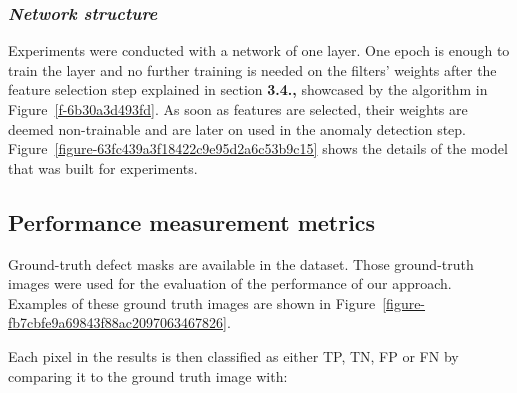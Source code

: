 \documentclass[3p,,preprint,review,12pt]{elsarticle}
\makeatletter
\def\fixFloatSize#1{}%
\makeatother
\begin{document}
\subsubsection{\textit{Network structure}}Experiments were conducted with a network of one layer. One epoch is enough to train the layer and no further training is needed on the filters' weights after the feature selection step explained in section \textbf{3.4.,} showcased by the algorithm in Figure~\ref{f-6b30a3d493fd}. As soon as features are selected, their weights are deemed non-trainable and are later on used in the anomaly detection step. Figure~\ref{figure-63fc439a3f18422c9e95d2a6c53b9c15} shows the details of the model that was built for experiments.
\bgroup
\fixFloatSize{Figures/Figure7.jpg}
\begin{figure*}[!htbp]
\centering \makeatletter{}
\makeatother 
\caption{{Overall Architecture for the Training and Testing phases of the Network used in the experiments. }}
\label{figure-63fc439a3f18422c9e95d2a6c53b9c15}
\end{figure*}
\egroup




\subsection{Performance measurement metrics}Ground-truth defect masks are available in the dataset. Those ground-truth images were used for the evaluation of the performance of our approach. Examples of these ground truth images are shown in Figure~\ref{figure-fb7cbfe9a69843f88ac2097063467826}. 

Each pixel in the results is then classified as either TP, TN, FP or FN by comparing it to the ground truth image with: 
\end{document}
